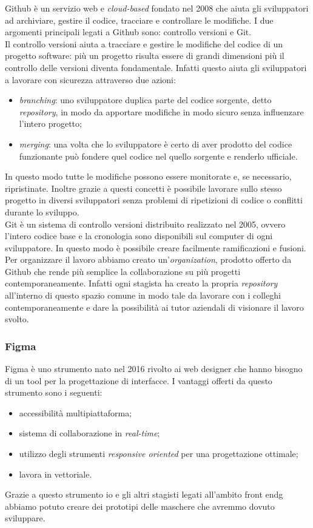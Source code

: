 Github è un servizio web e \textit{cloud-based} fondato nel 2008 che aiuta gli sviluppatori ad archiviare, gestire il codice, tracciare e controllare le modifiche. I due argomenti principali legati a Github sono: controllo versioni e Git.\\
Il controllo versioni aiuta a tracciare e gestire le modifiche del codice di un progetto software: più un progetto risulta essere di grandi dimensioni più il controllo delle versioni diventa fondamentale. Infatti questo aiuta gli sviluppatori a lavorare con sicurezza attraverso due azioni:
\begin{itemize}
	\item \textit{branching}: uno sviluppatore duplica parte del codice sorgente, detto \textit{repository}, in modo da apportare modifiche in modo sicuro senza influenzare l'intero progetto;
	\item \textit{merging}: una volta che lo sviluppatore è certo di aver prodotto del codice funzionante può fondere quel codice nel quello sorgente e renderlo ufficiale.
\end{itemize}
In questo modo tutte le modifiche possono essere monitorate e, se necessario, ripristinate. Inoltre grazie a questi concetti è possibile lavorare sullo stesso progetto in diversi sviluppatori senza problemi di ripetizioni di codice o conflitti durante lo sviluppo.\\
Git è un sistema di controllo versioni distribuito realizzato nel 2005, ovvero l'intero codice base e la cronologia sono disponibili sul computer di ogni sviluppatore. In questo modo è possibile creare facilmente ramificazioni e fusioni.\\
Per organizzare il lavoro abbiamo creato un'\textit{organization}, prodotto offerto da Github che rende più semplice la collaborazione su più progetti contemporaneamente. Infatti ogni stagista ha creato la propria \textit{repository} all'interno di questo spazio comune in modo tale da lavorare con i colleghi contemporaneamente e dare la possibilità ai tutor aziendali di visionare il lavoro svolto.

\subsubsection{Figma}
\label{subsubsec:figma}

Figma è uno strumento nato nel 2016 rivolto ai web designer che hanno bisogno di un tool per la progettazione di interfacce. I vantaggi offerti da questo strumento sono i seguenti:
\begin{itemize}
	\item accessibilità multipiattaforma;
	\item sistema di collaborazione in \textit{real-time};
	\item utilizzo degli strumenti \textit{responsive oriented} per una progettazione ottimale;
	\item lavora in vettoriale.
\end{itemize}
Grazie a questo strumento io e gli altri stagisti legati all'ambito \gls{front endg} abbiamo potuto creare dei prototipi delle maschere che avremmo dovuto sviluppare.


